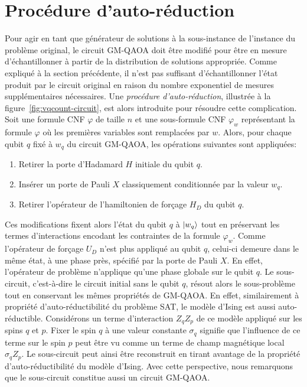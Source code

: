 
\section{Procédure d'auto-réduction}
\label{sec:procedure-auto-reduction}

Pour agir en tant que générateur de solutions à la sous-instance de l'instance du problème original, le circuit GM-QAOA doit être modifié pour être en mesure d'échantillonner à partir de la distribution de solutions appropriée. Comme expliqué à la section précédente, il n'est pas suffisant d'échantillonner l'état produit par le circuit original en raison du nombre exponentiel de mesures supplémentaires nécessaires. Une \textit{procédure d'auto-réduction}, illustrée à la figure~\ref{fig:vqcount-circuit}, est alors introduite pour résoudre cette complication. Soit une formule CNF $\varphi$ de taille $n$ et une sous-formule CNF $\varphi_{w}$ représentant la formule $\varphi$ où les premières variables sont remplacées par $w$. Alors, pour chaque qubit $q$ fixé à $w_{q}$ du circuit GM-QAOA, les opérations suivantes sont appliquées:

\begin{enumerate}[(1)]
    \item Retirer la porte d'Hadamard $H$ initiale du qubit $q$.
    \item Insérer un porte de Pauli $X$ classiquement conditionnée par la valeur $w_{q}$.
    \item Retirer l'opérateur de l'hamiltonien de forçage $H_{D}$ du qubit $q$.
\end{enumerate}

Ces modifications fixent alors l'état du qubit $q$ à $\ket{w_{q}}$ tout en préservant les termes d'interactions encodant les contraintes de la formule $\varphi_{w}$. Comme l'opérateur de forçage $U_{D}$ n'est plus appliqué au qubit $q$, celui-ci demeure dans le même état, à une phase près, spécifié par la porte de Pauli $X$. En effet, l'opérateur de problème n'applique qu'une phase globale sur le qubit $q$. Le sous-circuit, c'est-à-dire le circuit initial sans le qubit $q$, résout alors le sous-problème tout en conservant les mêmes propriétés de GM-QAOA. En effet, similairement à propriété d'auto-réductibilité du problème SAT, le modèle d'Ising est aussi auto-réductible. Considérons un terme d'interaction $Z_{q}Z_{p}$ de ce modèle appliqué sur les spins $q$ et $p$. Fixer le spin $q$ à une valeur constante $\sigma_{q}$ signifie que l'influence de ce terme sur le spin $p$ peut être vu comme un terme de champ magnétique local $\sigma_{q} Z_{p}$. Le sous-circuit peut ainsi être reconstruit en tirant avantage de la propriété d'auto-réductibilité du modèle d'Ising. Avec cette perspective, nous remarquons que le sous-circuit constitue aussi un circuit GM-QAOA.     


